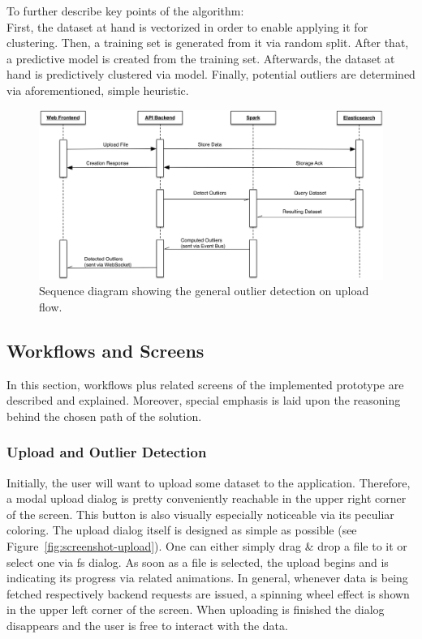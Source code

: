 To further describe key points of the algorithm:\\
First, the dataset at hand is vectorized in order to enable applying it for clustering.
Then, a training set is generated from it via random split.
After that, a predictive model is created from the training set.
Afterwards, the dataset at hand is predictively clustered via model.
Finally, potential outliers are determined via aforementioned, simple heuristic.

\begin{figure}[h]
  \centering
  \includegraphics[width=1.025\textwidth]{figures/implementation/outlier-detection-sequence}
  \caption{Sequence diagram showing the general outlier detection on upload flow.}
  \label{fig:outlier-detection-sequence}
\end{figure}

\newpage


\subsection{Workflows and Screens}

In this section, workflows plus related screens of the implemented prototype are described and explained.
Moreover, special emphasis is laid upon the reasoning behind the chosen path of the solution.


\subsubsection{Upload and Outlier Detection}

Initially, the user will want to upload some dataset to the application.
Therefore, a modal upload dialog is pretty conveniently reachable in the upper right corner of the screen.
This button is also visually especially noticeable via its peculiar coloring.
The upload dialog itself is designed as simple as possible (see Figure~\ref{fig:screenshot-upload}).
One can either simply drag \& drop a file to it or select one via \gls{fs} dialog.
As soon as a file is selected, the upload begins and is indicating its progress via related animations.
In general, whenever data is being fetched respectively backend requests are issued, a spinning wheel effect is shown in the upper left corner of the screen.
When uploading is finished the dialog disappears and the user is free to interact with the data.

